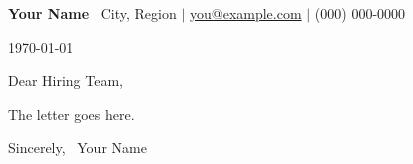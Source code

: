 \documentclass[11pt,letterpaper]{article}
\begin{document}
\textbf{\Large Your Name} \
City, Region $|$ \href{mailto:you@example.com}{you@example.com} $|$ (000) 000-0000

\today

Dear Hiring Team,

The letter goes here.

Sincerely, \
Your Name
\end{document}
